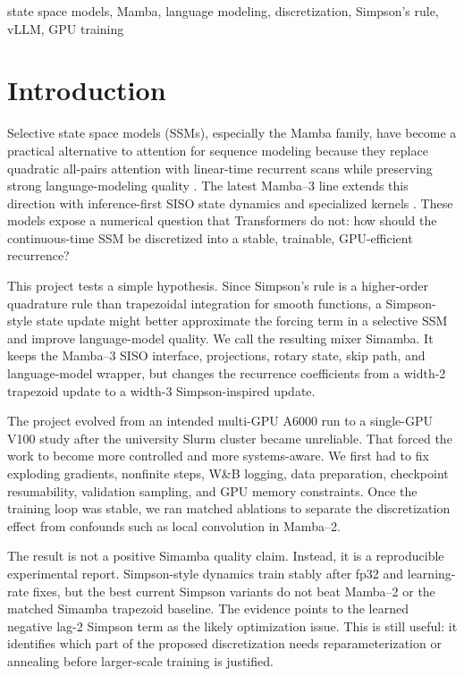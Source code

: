 \documentclass[conference]{IEEEtran}
\newcommand{\modelname}{Simamba\xspace}
\newcommand{\mamba}{Mamba\xspace}
\newcommand{\mambatwo}{Mamba--2\xspace}
\newcommand{\mambathree}{Mamba--3\xspace}
\begin{document}
\begin{IEEEkeywords}
state space models, Mamba, language modeling, discretization, Simpson's rule, vLLM, GPU training
\end{IEEEkeywords}

\section{Introduction}

Selective state space models (SSMs), especially the \mamba family, have become a practical alternative to attention for sequence modeling because they replace quadratic all-pairs attention with linear-time recurrent scans while preserving strong language-modeling quality \cite{mamba,mamba2}. The latest \mambathree line extends this direction with inference-first SISO state dynamics and specialized kernels \cite{mamba3}. These models expose a numerical question that Transformers do not: how should the continuous-time SSM be discretized into a stable, trainable, GPU-efficient recurrence?

This project tests a simple hypothesis. Since Simpson's rule is a higher-order quadrature rule than trapezoidal integration for smooth functions, a Simpson-style state update might better approximate the forcing term in a selective SSM and improve language-model quality. We call the resulting mixer \modelname. It keeps the \mambathree SISO interface, projections, rotary state, skip path, and language-model wrapper, but changes the recurrence coefficients from a width-2 trapezoid update to a width-3 Simpson-inspired update.

The project evolved from an intended multi-GPU A6000 run to a single-GPU V100 study after the university Slurm cluster became unreliable. That forced the work to become more controlled and more systems-aware. We first had to fix exploding gradients, nonfinite steps, W\&B logging, data preparation, checkpoint resumability, validation sampling, and GPU memory constraints. Once the training loop was stable, we ran matched ablations to separate the discretization effect from confounds such as local convolution in \mambatwo.

The result is not a positive \modelname quality claim. Instead, it is a reproducible experimental report. Simpson-style dynamics train stably after fp32 and learning-rate fixes, but the best current Simpson variants do not beat \mambatwo or the matched \modelname trapezoid baseline. The evidence points to the learned negative lag-2 Simpson term as the likely optimization issue. This is still useful: it identifies which part of the proposed discretization needs reparameterization or annealing before larger-scale training is justified.
\end{document}
